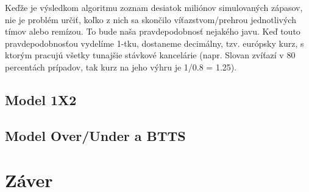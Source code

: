 \documentclass[10pt,twoside,slovak,a4paper]{article}
\begin{document}
Keďže je výsledkom algoritmu zoznam desiatok miliónov simulovaných zápasov, nie je problém určiť, koľko z nich sa skončilo víťazstvom/prehrou jednotlivých tímov alebo remízou. To bude naša pravdepodobnosť nejakého javu. Keď touto pravdepodobnosťou vydelíme 1-tku, dostaneme decimálny, tzv. európsky kurz, s ktorým pracujú všetky tunajšie stávkové kancelárie (napr. Slovan zvíťazí v 80 percentách prípadov, tak kurz na jeho výhru je 1/0.8 = 1.25).

\subsection{Model 1X2}


\subsection{Model Over/Under a BTTS}


\section{Záver} \label{zaver}




\end{document}
